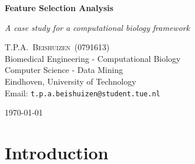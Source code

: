 \documentclass[10pt,a4paper]{article}
\newcommand{\documenttitle}{Feature Selection Analysis}
\newcommand{\documentsubtitle}{A case study for a computational biology framework}
\begin{document}
	
	\begin{titlepage}
		
		\center
		
		\vspace*{3cm}
		
		\textbf{\huge \documenttitle}
		
		\textit{\LARGE \documentsubtitle}
		
		\vspace*{2cm}
		
		\large
		\centering
		T.P.A.~\textsc{Beishuizen}~(0791613)\\
		Biomedical Engineering - Computational Biology\\
		Computer Science - Data Mining\\
		Eindhoven, University of Technology\\
		Email: \texttt{t.p.a.beishuizen@student.tue.nl}
		
		\vfill
		
		\vspace*{1cm}
		
		\today
		
	\end{titlepage}
	
	\tableofcontents
	
	
	\pagestyle{fancy}
	\fancyhead{} %
	\fancyfoot{} %
	\renewcommand{\headrulewidth}{0.4pt}
	\renewcommand{\footrulewidth}{0.4pt}
	
	\fancyhead[L]{\rightmark}
	\fancyfoot[C]{\thepage}
	
	
	\clearpage
	
	\newpage
	\section{Introduction}
	\label{sec:Introduction}
	
\end{document}
